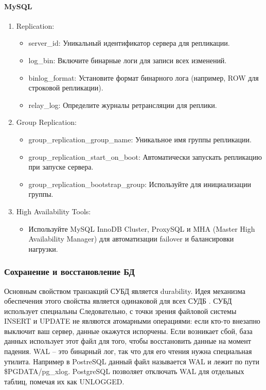 \paragraph{MySQL} \cite{availability-mysql}
\begin{enumerate}
    \item Replication:
    \begin{itemize}
        \item server\_id: Уникальный идентификатор сервера для репликации.
        \item log\_bin: Включите бинарные логи для записи всех изменений.
        \item binlog\_format: Установите формат бинарного лога (например, ROW для строковой репликации).
        \item relay\_log: Определите журналы ретрансляции для реплики.
    \end{itemize}
    \item Group Replication:
    \begin{itemize}
        \item group\_replication\_group\_name: Уникальное имя группы репликации.
        \item group\_replication\_start\_on\_boot: Автоматически запускать репликацию при запуске сервера.
        \item group\_replication\_bootstrap\_group: Используйте для инициализации группы.
    \end{itemize}
    \item High Availability Tools:
    \begin{itemize}
        \item Используйте MySQL InnoDB Cluster, ProxySQL и MHA (Master High Availability Manager) для автоматизации failover и балансировки нагрузки.
    \end{itemize}
\end{enumerate}
\subsubsection{Сохранение и восстановление БД}

Основным свойством транзакций СУБД является durability. Идея механизма обеспечения этого свойства является одинаковой для всех СУДБ \autocite{PostrgreSQL1}. СУБД использует специальны
Следовательно, с точки зрения файловой системы INSERT и UPDATE не являются атомарными операциями: если кто-то внезапно выключит ваш сервер, данные окажутся испорчены. Если возникает сбой, база данных использует этот файл для того, чтобы восстановить данные на момент падения. WAL -- это бинарный лог, так что для его чтения нужна специальная утилита.
Например в PostreSQL данный файл называется WAL и лежит по пути \$PGDATA/pg\_xlog.
PostgreSQL позволяет отключать WAL для отдельных таблиц, помечая их как UNLOGGED.

